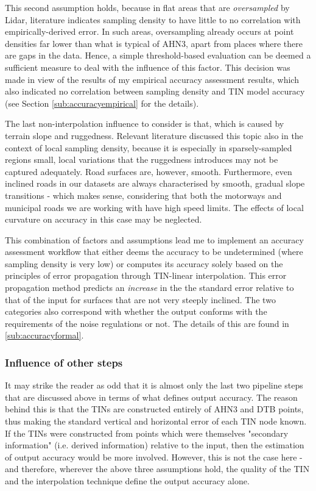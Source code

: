 This second assumption holds, because in flat areas that are \textit{oversampled} by Lidar, literature indicates sampling density to have little to no correlation with empirically-derived error. In such areas, oversampling already occurs at point densities far lower than what is typical of AHN3, apart from places where there are gaps in the data. Hence, a simple threshold-based evaluation can be deemed a sufficient measure to deal with the influence of this factor. This decision was made in view of the results of my empirical accuracy assessment results, which also indicated no correlation between sampling density and TIN model accuracy (see Section \ref{sub:accuracyempirical} for the details).

The last non-interpolation influence to consider is that, which is caused by terrain slope and ruggedness. Relevant literature discussed this topic also in the context of local sampling density, because it is especially in sparsely-sampled regions small, local variations that the ruggedness introduces may not be captured adequately. Road surfaces are, however, smooth. Furthermore, even inclined roads in our datasets are always characterised by smooth, gradual slope transitions - which makes sense, considering that both the motorways and municipal roads we are working with have high speed limits. The effects of local curvature on accuracy in this case may be neglected.

This combination of factors and assumptions lead me to implement an accuracy assessment workflow that either deems the accuracy to be undetermined (where sampling density is very low) or computes its accuracy solely based on the principles of error propagation through TIN-linear interpolation. This error propagation method predicts an \textit{increase} in the the standard error relative to that of the input for surfaces that are not very steeply inclined. The two categories also correspond with whether the output conforms with the requirements of the noise regulations or not. The details of this are found in \ref{sub:accuracyformal}.

\subsubsection{Influence of other steps}

It may strike the reader as odd that it is almost only the last two pipeline steps that are discussed above in terms of what defines output accuracy. The reason behind this is that the TINs are constructed entirely of AHN3 and DTB points, thus making the standard vertical and horizontal error of each TIN node known. If the TINs were constructed from points which were themselves "secondary information" (i.e. derived information) relative to the input, then the estimation of output accuracy would be more involved. However, this is not the case here - and therefore, wherever the above three assumptions hold, the quality of the TIN and the interpolation technique define the output accuracy alone.


